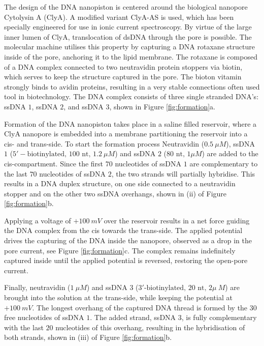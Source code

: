 The design of the DNA nanopiston is centered around the biological nanopore Cytolysin
A (ClyA). A modified variant ClyA-AS is used, which has been specially engineered for
use in ionic current spectroscopy.\cite{Soskine2012} By virtue of the large inner lumen
of ClyA,
translocation of dsDNA through the pore is possible. The molecular machine utilises this
property by capturing a DNA rotaxane structure inside of the pore, anchoring it to the
lipid membrane. The rotaxane is composed of a DNA complex connected to two neutravidin
protein stoppers via biotin, which serves to keep the structure captured in the pore.
The bioton vitamin strongly binds to avidin proteins, resulting in a very stable
connections often used tool in biotechnology. The DNA complex consists of three single
stranded DNA's:  ssDNA $1$, ssDNA $2$, and ssDNA $3$, shown in Figure
\ref{fig:formation}a.

Formation of the DNA nanopiston takes place in a saline filled reservoir, where a
ClyA nanopore is embedded into a membrane partitioning the reservoir into a cis- and
trans-side. To start the formation process Neutravidin ($0.5\ \mu M$), ssDNA $1$
($5′-\text{biotinylated, }100\text{ nt, }1.2\ \mu M$) and ssDNA $2$ ($80\text{ nt, }1
\mu M$) are added to the cis-compartment. Since the first $70$ nucleotides of ssDNA $1$
are complementary to the last $70$ nucleotides of ssDNA $2$, the two strands will
partially hybridise. This results in a DNA duplex structure, on one side connected to a
neutravidin stopper and on the other two ssDNA overhangs, shown in (ii) of Figure
\ref{fig:formation}b.

Applying a voltage of $+100\ mV$ over the reservoir results in a net force guiding the
DNA complex from the cis towards the trans-side. The applied potential drives the
capturing of the DNA inside the nanopore, observed as a drop in the pore current, see
Figure \ref{fig:formation}c. The complex remains indefinitely captured inside until the
applied potential is reversed, restoring the open-pore current.

Finally, neutravidin ($1\ \mu M$) and ssDNA $3$ ($3\text{′-biotinylated, }20\text{ nt, }2
\mu\ M$) are brought into the solution at the trans-side, while keeping the potential at
$+ 100\ mV$. The longest overhang of the captured DNA thread is formed by the 30 free
nucleotides of ssDNA $1$. The added strand, ssDNA $3$, is fully complementary with the
last $20$ nucleotides of this overhang, resulting in the hybridisation of both strands,
shown in (iii) of Figure \ref{fig:formation}b.

